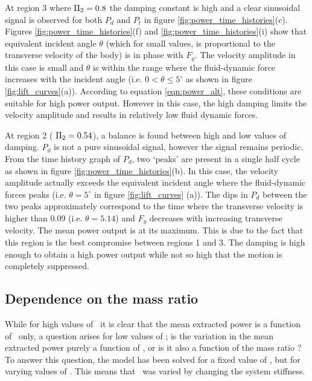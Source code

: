 \vspace{1mm} 
At region 3 where $\Pi_2=0.8$ the damping constant is high and a clear sinusoidal signal is observed for both $P_d$ and $P_t$ in figure \ref{fig:power_time_histories}(c). Figures \ref{fig:power_time_histories}(f) and  \ref{fig:power_time_histories}(i) show that equivalent incident angle $\theta$ (which for small values, is proportional to the transverse velocity of the body) is in phase with $F_y$.  The velocity amplitude in this case is small and $\theta$ is within the range where the fluid-dynamic force increases with the incident angle (i.e. $0<\theta \leq 5^\circ$ as shown in figure \ref{fig:lift_curves}(a)). According to equation \ref{eqn:power_alt}, these conditions are suitable for high power output. However in this case, the high damping limits the velocity amplitude and results in relatively low fluid dynamic forces.

At region 2 ( $\Pi_2=0.54$), a balance is found between high and low values of damping. $P_d$ is not a pure sinusoidal signal, however the signal remains periodic. From the time history graph of $P_d$, two `peaks' are present in a single half cycle as shown in figure \ref{fig:power_time_histories}(b). In this case, the velocity amplitude actually exceeds the equivalent incident angle where the fluid-dynamic forces peaks (i.e. $\theta=5^\circ$ in figure \ref{fig:lift_curves} (a)). The dips in $P_d$ between the two peaks approximately correspond to the time where the transverse velocity is higher than 0.09 (i.e. $\theta=5.14$) and $F_y$ decreases with increasing transverse velocity. The mean power output is at its maximum. This is due to the fact that this region is the best compromise between regions 1 and 3. The damping is high enough to obtain a high power output while not so high that the motion is completely suppressed.


\subsection{Dependence on the mass ratio \mstar}
\label{sec:mstar}
While for high values of \massstiff\ it is clear that the mean extracted power is a function of \massdamp\ only, a question arises for low values of \massstiff; is the variation in the mean extracted power purely a function of \massstiff, or is it also a function of the mass ratio \mstar? To answer this question, the model has been solved for a fixed value of \massstiff, but for varying values of \mstar. This means that \massstiff\ was varied by changing the system stiffness.

